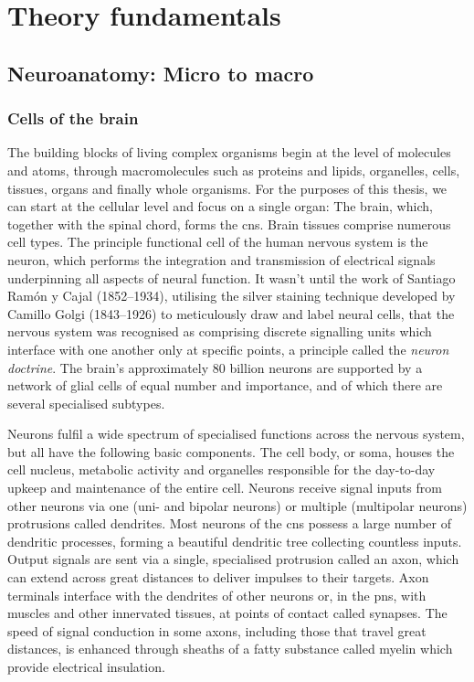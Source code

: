 
\chapter{Theory fundamentals}
\label{theory}

\section{Neuroanatomy: Micro to macro}

\subsection{Cells of the brain}

The building blocks of living complex organisms begin at the level of molecules and atoms, through macromolecules such as proteins and lipids, organelles, cells, tissues, organs and finally whole organisms.
For the purposes of this thesis, we can start at the cellular level and focus on a single organ:
The brain, which, together with the spinal chord, forms the \gls{cns}.
Brain tissues comprise numerous cell types.
The principle functional cell of the human nervous system is the neuron, which performs the integration and transmission of electrical signals underpinning all aspects of neural function.
It wasn't until the work of Santiago Ramón y Cajal (1852--1934), utilising the silver staining technique developed by Camillo Golgi (1843--1926) to meticulously draw and label neural cells, that the nervous system was recognised as comprising discrete signalling units which interface with one another only at specific points, a principle called the \textit{neuron doctrine}.\autocite{Kandel2021a}
The brain's approximately 80 billion neurons are supported by a network of glial cells of equal number and importance,\autocite{Herculano-Houzel2014,vonBartheld2016} and of which there are several specialised subtypes.

Neurons fulfil a wide spectrum of specialised functions across the nervous system, but all have the following basic components.
The cell body, or soma, houses the cell nucleus, metabolic activity and organelles responsible for the day-to-day upkeep and maintenance of the entire cell.
Neurons receive signal inputs from other neurons via one (uni- and bipolar neurons) or multiple (multipolar neurons) protrusions called dendrites.
Most neurons of the \gls{cns} possess a large number of dendritic processes, forming a beautiful dendritic tree collecting countless inputs.
Output signals are sent via a single, specialised protrusion called an axon, which can extend across great distances to deliver impulses to their targets.
Axon terminals interface with the dendrites of other neurons or, in the \gls{pns}, with muscles and other innervated tissues, at points of contact called synapses.
The speed of signal conduction in some axons, including those that travel great distances, is enhanced through sheaths of a fatty substance called myelin which provide electrical insulation.

